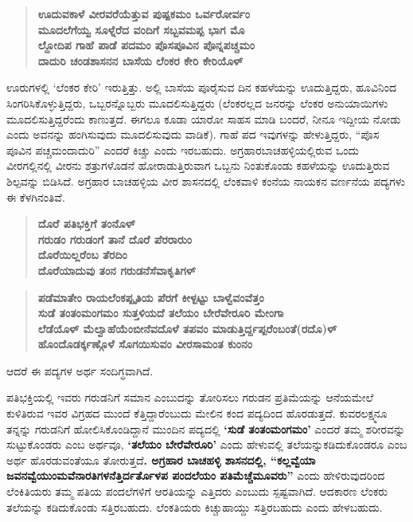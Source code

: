 \begin{verse}
\textbf{ಊದುವಕಾಳೆ ವೀರವರೆಯೆತ್ತುವ ಪುಷ್ಪಕಮಂ ಒರ್ವರೋರ್ವಂ } \\\textbf{ಮೂದಲೆಗೆಯ್ವ ಸೂಳ್ನೆರೆದ ವಂದಿಗೆ ಸಬ್ಬವಮಪ್ಪ ಭಾಗ ಮೊ} \\\textbf{ ಲ್ದೋದಿಪ ಗಾಹೆ ಪಾಡೆ ಪದಮಂ ಪೊಸಪೂವಿನ ಪೊನ್ನಪಚ್ಚಮಂ} \\\textbf{ದಾದುರಿ ಚಂಡಶಾಸನನ ಬಾಸೆಯ ಲೆಂಕರ ಕೇರಿ ಕೇರಿಯೊಳ್​ }
\end{verse}

ಊರುಗಳಲ್ಲಿ ‘ಲೆಂಕರ ಕೇರಿ’ ಇರುತ್ತಿತ್ತು. ಅಲ್ಲಿ ಬಾಸೆಯ ಪೂರೈಸುವ ದಿನ ಕಹಳೆಯನ್ನು ಊದುತ್ತಿದ್ದರು, ಹೂವಿನಿಂದ ಸಿಂಗರಿಸಿಕೊಳ್ಳುತ್ತಿದ್ದರು, ಒಬ್ಬರನ್ನೊಬ್ಬರು ಮೂದಲಿಸುತ್ತಿದ್ದರು (ಲೆಂಕರಲ್ಲದ ಜನರನ್ನು ಲೆಂಕರ ಅನುಯಾಯಿಗಳು ಮೂದಲಿಸುತ್ತಿದ್ದ\-ರೆಂದು ಕಾಣುತ್ತದೆ. ಈಗಲೂ ಕೂಡಾ ಯಾರೋ ಸಾಹಸ ಮಾಡಿ ಬಂದರೆ, ನೀನೂ ಇದ್ದೀಯ ನೋಡು ಎಂದು ಅವನನ್ನು ಹಂಗಿಸುವುದು ಮೂದಲಿಸುವುದು ವಾಡಿಕೆ). ಗಾಹೆ ಪದ ಇವುಗಳನ್ನು ಹೇಳುತ್ತಿದ್ದರು, “ಪೊಸ ಪೂವಿನ ಪಚ್ಚಮಂದಾದುರಿ” ಎಂದರೆ ಕಿಚ್ಚು ಎಂದು ಇರಬಹುದು. ಅಗ್ರಹಾರಬಾಚಹಳ್ಳಿಯಲ್ಲಿರುವ ಒಂದು ವೀರಗಲ್ಲಿನಲ್ಲಿ ವೀರನು ಶತ್ರುಗಳೊಡನೆ ಹೋರಾಡುತ್ತಿರುವಾಗ ಒಬ್ಬನು ನಿಂತುಕೊಂಡು ಕಹಳೆಯನ್ನು ಊದುತ್ತಿರುವ ಶಿಲ್ಪವನ್ನು ಬಿಡಿಸಿದೆ. ಅಗ್ರಹಾರ ಬಾಚಹಳ್ಳಿಯ ವೀರ ಶಾಸನದಲ್ಲಿ ಲೆಂಕವಾಳಿ ಕಂನೆಯ ನಾಯಕನ ವರ್ಣನೆಯ ಪದ್ಯಗಳು ಈ ಕೆಳಗಿನಂತಿವೆ.

\begin{verse}
\textbf{ದೊರೆ ಪತಿಭಕ್ತಿಗೆ ತಂನೊಳ್​} \\\textbf{ಗರುಡಂ ಗರುಡಂಗೆ ತಾನೆ ದೊರೆ ಪೆರರಾರುಂ} \\\textbf{ದೊರೆಯಿಲ್ಲರೆಂಬ ತೆರದಿಂ} \\\textbf{ದೊರೆಯಾದುವು ತಂನ ಗರುಡನೆಸೆವಾಕೃತಿಗಳ್​}
\end{verse}

\begin{verse}
\textbf{ಪಡೆಮಾತೇಂ ರಾಯಲೆಂಕಪ್ಪೃತಿಯ ಪೆರಗೆ ಕೀಳ್ಪಟ್ಟು ಬಾಳ್ವೆವಂವೆತ್ತಂ} \\\textbf{ಸುಡೆ ತಂತಂಮಂಗಮಂ ಸುತ್ತಳಿಯದೆ ತಲೆಯಂ ಬೇರೆವೇರೂರಿ ಮೇಂಗಾ} \\\textbf{ಲೆಡೆಯೊಳ್​ ಮೆಲ್ವಾಹೆಯೆಂಬೀನೆವದೊಳೆ ತಪವಂ ಮಾಡುತ್ತಿರ್ದ್ದಪ್ಪರೆಂಬಂತೆ(ರದೊ)ಳ್​} \\\textbf{ಹೊಂದೊಡರ್ಕ್ಕಣ್ಗೊಳೆ ಸೊಗಯಿಸುವಂ ವೀರಸಾಮಂತ ಕುಂನಂ}
\end{verse}

ಆದರೆ ಈ ಪದ್ಯಗಳ ಅರ್ಥ ಸಂದಿಗ್ಧವಾಗಿದೆ.

ಪತಿಭಕ್ತಿಯಲ್ಲಿ ಇವರು ಗರುಡನಿಗೆ ಸಮಾನ ಎಂಬುದನ್ನು ತೋರಿಸಲು ಗರುಡನ ಪ್ರತಿಮೆಯನ್ನು ಆನೆಯ\break ಮೇಲೆ ಕುಳಿತಿರುವ ಇವರ ವಿಗ್ರಹದ ಮುಂದೆ ಕೆತ್ತಿದ್ದಾರೆಂಬುದು ಮೇಲಿನ ಕಂದ ಪದ್ಯದಿಂದ ಹೊರಡುತ್ತದೆ. ಕುವರ\break ಲಕ್ಷ್ಮನೂ ತನ್ನನ್ನು ಗರುಡನಿಗೆ ಹೋಲಿಸಿಕೊಂಡಿದ್ದಾನೆ ಮುಂದಿನ ಪದ್ಯದಲ್ಲಿ \textbf{‘ಸುಡೆ ತಂತಂಮಂಗಮಂ’} ಎಂದರೆ ತಮ್ಮ ಶರೀರವನ್ನು ಸುಟ್ಟುಕೊಂಡರು ಎಂಬ ಅರ್ಥವೂ, \textbf{‘ತಲೆಯಂ ಬೇರೆವೇರೂರಿ’} ಎಂದು ಹೇಳುವಲ್ಲಿ ತಲೆಯನ್ನು\break ಕಡಿದುಕೊಂಡರೂ ಎಂಬ ಅರ್ಥ ಹೊರಡುವಂತೆಯೂ ತೋರುತ್ತದೆ\textbf{. ಅಗ್ರಹಾರ ಬಾಚಹಳ್ಳಿ ಶಾಸನದಲ್ಲಿ, “ಕಲ್ಲವ್ವೆಯಾ ಜವನವ್ವೆಯುಂಮವೆನಾರತಿಗಳನೆತ್ತಿರ್ದರ್ತೊಳಪ ಪಂದಲೆಯಂ ಪತಿಮೆಚ್ಚೆಮೂವರು”} ಎಂದು ಹೇಳಿರುವುದರಿಂದ ಲೆಂಕಿತಿಯರು ತಮ್ಮ ಪತಿಯ ಪಂದಲೆಗಳಿಗೆ ಆರತಿಯನ್ನು ಎತ್ತಿದರು ಎಂಬುದು ಸ್ಪಷ್ಟವಾಗಿದೆ. ಆದಕಾರಣ ಲೆಂಕರು ತಲೆಯನ್ನು ಕಡಿದುಕೊಂಡು ಸತ್ತಿರಬಹುದು. ಲೆಂಕತಿಯರು ಕಿಚ್ಚುಹಾಯ್ದು ಸತ್ತಿರಬಹುದು ಎಂದು ಹೇಳಬಹುದು.

